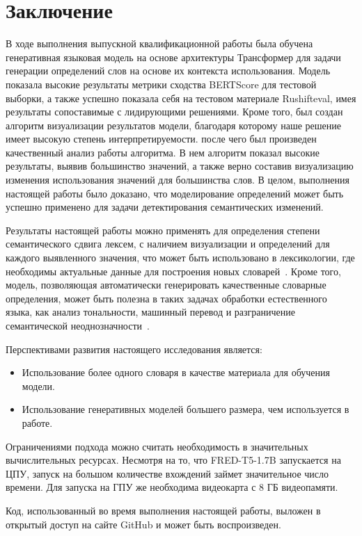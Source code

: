 \documentclass[LI,VKR]{HSEUniversity}
\begin{document}
\chapter*{Заключение}

В ходе выполнения выпускной квалификационной работы была обучена генеративная языковая модель
на основе архитектуры Трансформер для задачи генерации определений слов на основе их
контекста использования.
Модель показала высокие результаты метрики сходства BERTScore для тестовой выборки,
а также успешно показала себя на тестовом материале Rushifteval,
имея результаты сопоставимые с лидирующими решениями.
Кроме того, был создан алгоритм визуализации результатов модели,
благодаря которому наше решение имеет высокую степень интерпретируемости.
после чего был произведен качественный анализ работы алгоритма.
В нем алгоритм показал высокие результаты, выявив большинство значений,
а также верно составив визуализацию изменения использования значений для большинства слов.
В целом, выполнения настоящей работы было доказано, что моделирование определений может быть
успешно применено для задачи детектирования семантических изменений.

Результаты настоящей работы можно применять для определения степени семантического сдвига лексем,
с наличием визуализации и определений для каждого выявленного значения,
что может быть использовано в лексикологии,
где необходимы актуальные данные для построения новых словарей~\cite{DefinitionGenerationMainArticle}.
Кроме того, модель, позволяющая автоматически генерировать качественные словарные определения,
может быть полезна в таких задачах обработки естественного языка,
как анализ тональности, машинный перевод и разграничение семантической
неоднозначности~\cite{DefinitionModelingReviewAndDatasetAnalysis}.

Перспективами развития настоящего исследования является:
\begin{itemize}
    \item Использование более одного словаря в качестве материала для обучения модели.
    \item Использование генеративных моделей большего размера, чем используется в работе.
\end{itemize}

Ограничениями подхода можно считать необходимость в значительных вычислительных ресурсах.
Несмотря на то, что FRED-T5-1.7B запускается на ЦПУ, запуск на большом количестве вхождений
займет значительное число времени.
Для запуска на ГПУ же необходима видеокарта с 8 ГБ видеопамяти.

Код, использованный во время выполнения настоящей работы, выложен в открытый доступ
на сайте GitHub и может быть воспроизведен.~

\printbibliography
\appendix

\end{document}
